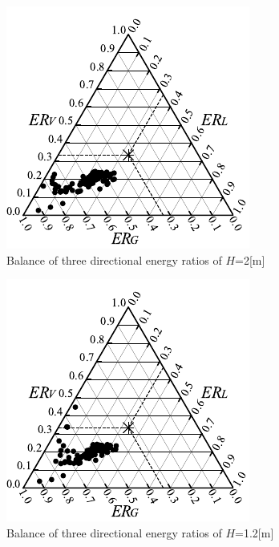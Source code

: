 \begin{figure}[H]
    \centering
    \includegraphics[keepaspectratio,scale=1.2]{05_att/reflect/rec_Ternary_out_2m.pdf}
    \caption{\hspace{1mm}Balance of three directional energy ratios of $H$=2[m]}
    \label{fig:sankaku2_r}
\end{figure}

\begin{figure}[H]
    \centering
    \includegraphics[keepaspectratio,scale=1.2]{05_att/reflect/rec_Ternary_out_1m.pdf}
    \caption{\hspace{1mm}Balance of three directional energy ratios of $H$=1.2[m]}
    \label{fig:sankaku1_r}
\end{figure}

